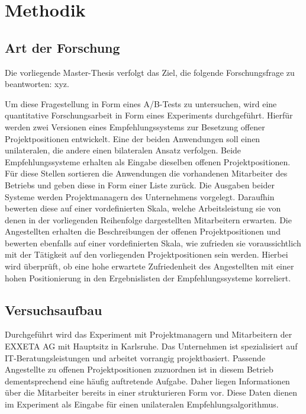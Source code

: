 \chapter{Methodik}
\label{ch:methodik}

\section{Art der Forschung}
\label{ch:methodik:art}
Die vorliegende Master-Thesis verfolgt das Ziel, die folgende Forschungsfrage zu beantworten: xyz.

Um diese Fragestellung in Form eines A/B-Tests zu untersuchen, wird eine quantitative Forschungsarbeit in Form eines Experiments durchgeführt. Hierfür werden zwei Versionen eines Empfehlungssystems zur Besetzung offener Projektpositionen entwickelt. Eine der beiden Anwendungen soll einen unilateralen, die andere einen bilateralen Ansatz verfolgen. Beide Empfehlungssysteme erhalten als Eingabe dieselben offenen Projektpositionen. Für diese Stellen sortieren die Anwendungen die vorhandenen Mitarbeiter des Betriebs und geben diese in Form einer Liste zurück. Die Ausgaben beider Systeme werden Projektmanagern des Unternehmens vorgelegt. Daraufhin bewerten diese auf einer vordefinierten Skala, welche Arbeitsleistung sie von denen in der vorliegenden Reihenfolge dargestellten Mitarbeitern erwarten. Die Angestellten erhalten die Beschreibungen der offenen Projektpositionen und bewerten ebenfalls auf einer vordefinierten Skala, wie zufrieden sie voraussichtlich mit der Tätigkeit auf den vorliegenden Projektpositionen sein werden. Hierbei wird überprüft, ob eine hohe erwartete Zufriedenheit des Angestellten mit einer hohen Positionierung in den Ergebnislisten der Empfehlungssysteme korreliert.

\section{Versuchsaufbau}
\label{ch:methodik:versuchsaufbau}
Durchgeführt wird das Experiment mit Projektmanagern und Mitarbeitern der EXXETA AG mit Hauptsitz in Karlsruhe. Das Unternehmen ist spezialisiert auf IT-Beratungsleistungen und arbeitet vorrangig projektbasiert. Passende Angestellte zu offenen Projektpositionen zuzuordnen ist in diesem Betrieb dementsprechend eine häufig auftretende Aufgabe. Daher liegen Informationen über die Mitarbeiter bereits in einer strukturieren Form vor. Diese Daten dienen im Experiment als Eingabe für einen unilateralen Empfehlungsalgorithmus.

